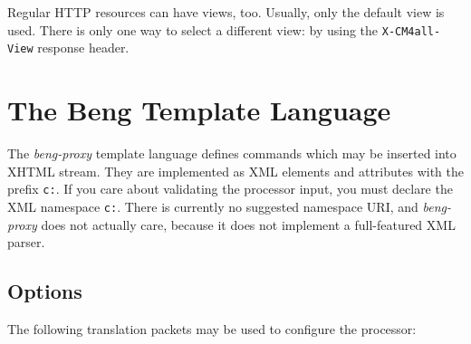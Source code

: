 \documentclass[a4paper,12pt]{article}
\begin{document}
Regular HTTP resources can have views, too.  Usually, only the default
view is used.  There is only one way to select a different view: by
using the \texttt{X-CM4all-View} response header.

\section{The Beng Template Language}
\label{processor}

The \emph{beng-proxy} template language defines commands which may be
inserted into XHTML stream.  They are implemented as XML elements and
attributes with the prefix \texttt{c:}.  If you care about validating
the processor input, you must declare the XML namespace \texttt{c:}.
There is currently no suggested namespace URI, and \emph{beng-proxy}
does not actually care, because it does not implement a full-featured
XML parser.

\subsection{Options}

The following translation packets may be used to configure the
processor:
\end{document}
